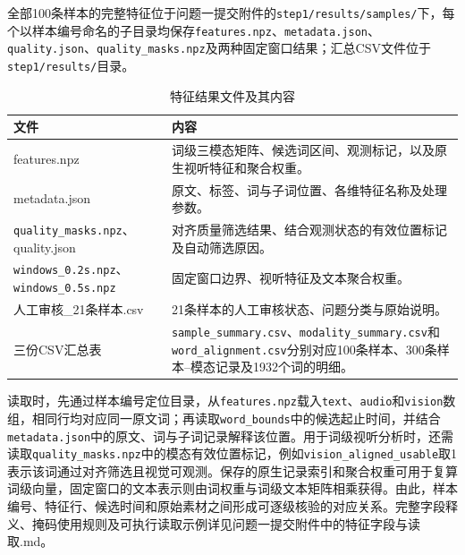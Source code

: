 全部100条样本的完整特征位于问题一提交附件的\nolinkurl{step1/results/samples/}下，每个以样本编号命名的子目录均保存\nolinkurl{features.npz}、\nolinkurl{metadata.json}、\nolinkurl{quality.json}、\nolinkurl{quality_masks.npz}及两种固定窗口结果；汇总CSV文件位于\nolinkurl{step1/results/}目录。

\begin{table}[H]
    \centering\small
    \caption{特征结果文件及其内容}
    \label{tab:p1_files}
    \setlength{\tabcolsep}{6pt}
    \renewcommand{\arraystretch}{1.12}
    \ifdefined\pOneCompactTableBox\else\newsavebox{\pOneCompactTableBox}\fi
    \begin{lrbox}{\pOneCompactTableBox}
    \begin{tabular}{l>{\raggedright\arraybackslash}p{24em}}
        \toprule
        文件 & 内容\\
        \midrule
        features.npz & 词级三模态矩阵、候选词区间、观测标记，以及原生视听特征和聚合权重。\\
        metadata.json & 原文、标签、词与子词位置、各维特征名称及处理参数。\\
        \nolinkurl{quality_masks.npz}、\newline quality.json & 对齐质量筛选结果、结合观测状态的有效位置标记及自动筛选原因。\\
        \nolinkurl{windows_0.2s.npz}、\newline\nolinkurl{windows_0.5s.npz} & 固定窗口边界、视听特征及文本聚合权重。\\
        人工审核\_21条样本.csv & 21条样本的人工审核状态、问题分类与原始说明。\\
        三份CSV汇总表 & \nolinkurl{sample_summary.csv}、\nolinkurl{modality_summary.csv}和\nolinkurl{word_alignment.csv}分别对应100条样本、300条样本--模态记录及1932个词的明细。\\
        \bottomrule
    \end{tabular}
    \end{lrbox}
    \usebox{\pOneCompactTableBox}
\end{table}

读取时，先通过样本编号定位目录，从\nolinkurl{features.npz}载入\nolinkurl{text}、\nolinkurl{audio}和\nolinkurl{vision}数组，相同行均对应同一原文词；再读取\nolinkurl{word_bounds}中的候选起止时间，并结合\nolinkurl{metadata.json}中的原文、词与子词记录解释该位置。用于词级视听分析时，还需读取\nolinkurl{quality_masks.npz}中的模态有效位置标记，例如\nolinkurl{vision_aligned_usable}取1表示该词通过对齐筛选且视觉可观测。保存的原生记录索引和聚合权重可用于复算词级向量，固定窗口的文本表示则由词权重与词级文本矩阵相乘获得。由此，样本编号、特征行、候选时间和原始素材之间形成可逐级核验的对应关系。完整字段释义、掩码使用规则及可执行读取示例详见问题一提交附件中的\textnormal{特征字段与读取.md}。

